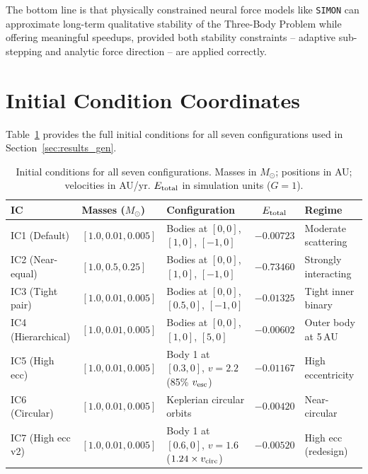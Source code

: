 \documentclass[12pt,a4paper]{article}
\newcommand{\simon}{\texttt{SIMON}}
\begin{document}
The bottom line is that physically constrained neural force models like \simon{} can approximate long-term qualitative stability of the Three-Body Problem while offering meaningful speedups, provided both stability constraints -- adaptive sub-stepping and analytic force direction -- are applied correctly.




\appendix

\section{Initial Condition Coordinates}
\label{app:ics}

Table~\ref{tab:ic_coords} provides the full initial conditions for all seven configurations used in Section~\ref{sec:results_gen}.

\begin{table}[H]
\centering
\caption{Initial conditions for all seven configurations. Masses in $M_\odot$; positions in AU; velocities in AU/yr. $E_{\rm total}$ in simulation units ($G=1$).}
\label{tab:ic_coords}
\small
\begin{tabular}{lllcl}
\toprule
\textbf{IC} & \textbf{Masses ($M_\odot$)} & \textbf{Configuration} & \textbf{$E_{\rm total}$} & \textbf{Regime} \\
\midrule
IC1 (Default)      & $[1.0, 0.01, 0.005]$ & Bodies at $[0,0]$, $[1,0]$, $[-1,0]$    & $-0.00723$ & Moderate scattering \\
IC2 (Near-equal)   & $[1.0, 0.5, 0.25]$   & Bodies at $[0,0]$, $[1,0]$, $[-1,0]$    & $-0.73460$ & Strongly interacting \\
IC3 (Tight pair)   & $[1.0, 0.01, 0.005]$ & Bodies at $[0,0]$, $[0.5,0]$, $[-1,0]$  & $-0.01325$ & Tight inner binary \\
IC4 (Hierarchical) & $[1.0, 0.01, 0.005]$ & Bodies at $[0,0]$, $[1,0]$, $[5,0]$     & $-0.00602$ & Outer body at 5\,AU \\
IC5 (High ecc)     & $[1.0, 0.01, 0.005]$ & Body 1 at $[0.3,0]$, $v=2.2$ (85\% $v_{\rm esc}$) & $-0.01167$ & High eccentricity \\
IC6 (Circular)     & $[1.0, 0.01, 0.005]$ & Keplerian circular orbits                & $-0.00420$ & Near-circular \\
IC7 (High ecc v2)  & $[1.0, 0.01, 0.005]$ & Body 1 at $[0.6,0]$, $v=1.6$ ($1.24\times v_{\rm circ}$) & $-0.00520$ & High ecc (redesign) \\
\bottomrule
\end{tabular}
\end{table}
\end{document}
